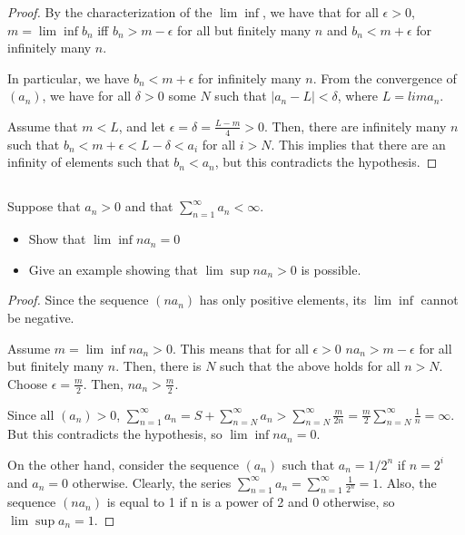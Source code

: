 \begin{proof}

By the characterization of the $\lim \inf$, we have that for all $\epsilon > 0$, $m = \lim \inf b_n$ iff $b_n > m-\epsilon$ for all but finitely many $n$ and $b_n < m+\epsilon$ for infinitely many $n$.

In particular, we have $b_n < m+\epsilon$ for infinitely many $n$. From the convergence of $(a_n)$, we have for all $\delta > 0$ some $N$ such that $|a_n - L| < \delta$, where $L = lim a_n$.

Assume that $m < L$, and let $\epsilon = \delta = \frac{L - m}{4} > 0$. Then, there are infinitely many $n$ such that $b_n < m + \epsilon < L - \delta < a_i$ for all $i > N$. This implies that there are an infinity of elements such that $b_n < a_n$, but this contradicts the hypothesis. 

\end{proof}




\subsection{} Suppose that $a_n > 0$ and that $\sum_{n=1}^\infty a_n < \infty$.
\begin{itemize}
    \item Show that $\lim \inf n a_n = 0$
    \item Give an example showing that $\lim \sup na_n > 0$ is possible.
\end{itemize}

\begin{proof}
Since the sequence $(na_n)$ has only positive elements, its $\lim \inf$ cannot be negative.

Assume $m = \lim \inf n a_n > 0$. This means that for all $\epsilon > 0$  $na_n > m - \epsilon$ for all but finitely many $n$. Then, there is $N$ such that the above holds for all $n>N$. Choose $\epsilon = \frac{m}{2}$. Then, $n a_n > \frac{m}{2}$.

Since all $(a_n) > 0$, $\sum_{n=1}^\infty a_n = S + \sum_{n=N}^\infty a_n  > \sum _{n=N}^\infty \frac{m}{2n} = \frac{m}{2}\sum_{n=N}^\infty \frac{1}{n} = \infty$. But this contradicts the hypothesis, so $\lim \inf n a_n = 0$.

On the other hand, consider the sequence $(a_n)$ such that $a_n = 1/2^n$ if $n=2^i$ and $a_n = 0$ otherwise. Clearly, the series $\sum_{n=1}^\infty a_n = \sum_{n=1}^\infty \frac{1}{2^n} = 1$. Also, the sequence $(na_n)$ is equal to 1 if n is a power of 2 and 0 otherwise, so $\lim \sup a_n = 1$.

\end{proof}


